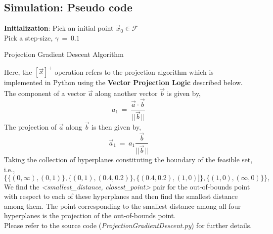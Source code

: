 \documentclass[12pt, draftcls, onecolumn]{IEEEtran}
\begin{document}
\subsection{Simulation: Pseudo code}
\begin{algorithm}[H]
\SetAlgoLined
{}
 \textbf{Initialization}: Pick an initial point $\vec{x}_0 \in \mathcal{F}$\;
 \\Pick a step-size, $\gamma\ =\ 0.1$\newline
\caption{Projection Gradient Descent Algorithm}
\end{algorithm}
Here, the $[\vec{x}]^+$ operation refers to the projection algorithm which is implemented in Python using the \textbf{Vector Projection Logic} described below.
The component of a vector $\vec{a}$ along another vector $\vec{b}$ is given by,
\[a_1\ =\ \frac{\vec{a} \cdot \vec{b}}{||\vec{b}||}\]
The projection of $\vec{a}$ along $\vec{b}$ is then given by,
\[\vec{a}_1\ =\ a_1 \frac{\vec{b}}{||\vec{b}||}\]
Taking the collection of hyperplanes constituting the boundary of the feasible set, i.e.,
\[\{\{(0, \infty), (0, 1)\}, \{(0, 1), (0.4, 0.2)\}, \{(0.4, 0.2), (1, 0)]\}, \{(1, 0), (\infty, 0)\}\},\]
We find the \textit{<smallest\_distance, closest\_point>} pair for the out-of-bounds point with respect to each of these hyperplanes and then find the smallest distance among them. The point corresponding to the smallest distance among all four hyperplanes is the projection of the out-of-bounds point.
\\Please refer to the source code (\textit{ProjectionGradientDescent.py}) for further details.
\end{document}
